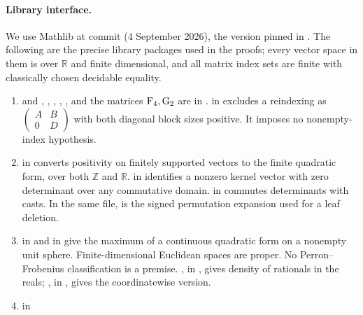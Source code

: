 \paragraph{Library interface.}\label{facts:rem-library}
We use Mathlib at commit 
(4 September 2026), the version pinned in . The following
are the precise library packages used in the proofs; every vector space in
them is over $\mathbb R$ and finite dimensional, and all matrix index sets
are finite with classically chosen decidable equality.
\begingroup\raggedright
\begin{enumerate}
\item {} and ,
, , ,
, and the matrices $\mathrm{F}_4,\mathrm{G}_2$ are in
.
 in
 excludes a reindexing as
$\left(\begin{smallmatrix}A&B\\0&D\end{smallmatrix}\right)$ with both
diagonal block sizes positive. It imposes no nonempty-index hypothesis.
\item {} in
 converts positivity on
finitely supported vectors to the finite quadratic form, over both
$\mathbb Z$ and $\mathbb R$.
 in
 identifies a nonzero
kernel vector with zero determinant over any commutative domain.
 in
 commutes
determinants with casts. In the same file, 
is the signed permutation expansion used for a leaf deletion.
\item {} in
 and
 in
 give the maximum of a continuous
quadratic form on a nonempty unit sphere. Finite-dimensional Euclidean
spaces are proper. No Perron--Frobenius classification is a premise.
, in
, gives density of
rationals in the reals; , in
, gives the coordinatewise version.
\item {} in

\end{enumerate}
